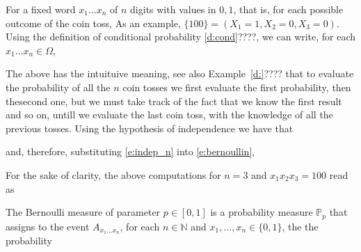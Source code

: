 
	For a fixed word $x_1 \ldots x_n$ of $n$ digits with values in $0,1$, that is, for each possible outcome of the coin toss, 
	As an example, $\{100\} = (X_1 = 1, X_2 = 0 , X_3 = 0 )$. Using the definition of conditional probability \eqref{d:cond}????, we can write, for each $x_1\ldots x_n \in \Omega$, 

	The above has the intuituive meaning, see also Example~\ref{d:}???? that to evaluate the probability of all the $n$ coin tosses we first evaluate the first probability, then thesecond one, but we must take track of the fact that we know the first result and so on, untill we evaluate the last coin toss, with the knowledge of all the previous tosses. Using the hypothesis of independence we have that 	

	
	and, therefore, substituting \eqref{e:indep_n} into \eqref{e:bernoullin}, 
	
	For the sake of clarity, the above computations for $n =3$ and $x_1x_2 x_3 = 100$ read as 
	
	\begin{definition}
	\label{d:Bernoulli_measure}
	The Bernoulli measure of parameter $p \in [0,1]$ is a probability measure $\mathbb P_p$ that assigns to the event $A_{x_1\ldots x_n}$, for each $n \in \mathbb N$ and $x_1, \ldots, x_n \in \{0,1\}$, the  the probability 
	\end{definition}

